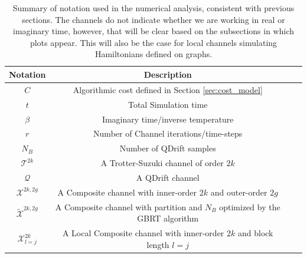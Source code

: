 \begin{table}[htbp!] 
    \centering
    \begin{tabular}{| c | c | c | c |}
    \hline
        Notation & Description  \\
        \hline
        $C$ & Algorithmic cost defined in Section \ref{sec:cost_model} \\
        $t$ & Total Simulation time \\
        $\beta$ & Imaginary time/inverse temperature \\
        $r$ & Number of Channel iterations/time-steps \\
        $N_B$ & Number of QDrift samples \\
        $\mathcal{T}^{2k}$ & A Trotter-Suzuki channel of order $2k$  \\
        $\mathcal{Q}$ & A QDrift channel  \\
        $\mathcal{X}^{2k, 2g}$ & A Composite channel with inner-order $2k$ and outer-order $2g$ \\
        $\widetilde{\mathcal{X}}^{2k, 2g}$ & A Composite channel with partition and $N_B$ optimized by the GBRT algorithm \\
        $\mathcal{X}^{2k}_{l=j}$ & A Local Composite channel with inner-order $2k$ and block length $l=j$ \\
        \hline
    \end{tabular} 
    \caption{Summary of notation used in the numerical analysis, consistent with previous sections. The channels do not indicate whether we are working in real or imaginary time, however, that will be clear based on the subsections in which plots appear. This will also be the case for local channels simulating Hamiltonians defined on graphs.}
    \label{tab:notation}
\end{table} 

